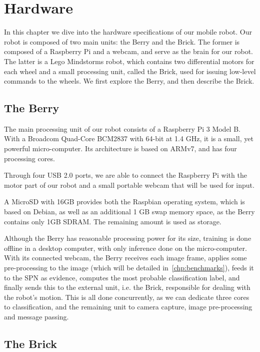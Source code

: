 
\chapter{Hardware}\label{chp:hardware}

In this chapter we dive into the hardware specifications of our mobile robot. Our robot is composed
of two main units: the Berry and the Brick. The former is composed of a Raspberry Pi and a webcam,
and serve as the brain for our robot. The latter is a Lego Mindstorms robot, which contains two
differential motors for each wheel and a small processing unit, called the Brick, used for issuing
low-level commands to the wheels. We first explore the Berry, and then describe the Brick.

\section{The Berry}

The main processing unit of our robot consists of a Raspberry Pi 3 Model B. With a Broadcom
Quad-Core BCM2837 with 64-bit at 1.4 GHz, it is a small, yet powerful micro-computer. Its
architecture is based on ARMv7, and has four processing cores.

Through four USB 2.0 ports, we are able to connect the Raspberry Pi with the motor part of our
robot and a small portable webcam that will be used for input.

A MicroSD with 16GB provides both the Raspbian operating system, which is based on Debian, as well
as an additional 1 GB swap memory space, as the Berry contains only 1GB SDRAM. The remaining amount
is used as storage.

Although the Berry has reasonable processing power for its size, training is done offline in a
desktop computer, with only inference done on the micro-computer. With its connected webcam, the
Berry receives each image frame, applies some pre-processing to the image (which will be detailed
in~\autoref{chp:benchmarks}), feeds it to the SPN as evidence, computes the most probable
classification label, and finally sends this to the external unit, i.e. the Brick, responsible for
dealing with the robot's motion. This is all done concurrently, as we can dedicate three cores to
classification, and the remaining unit to camera capture, image pre-processing and message passing.

\section{The Brick}

